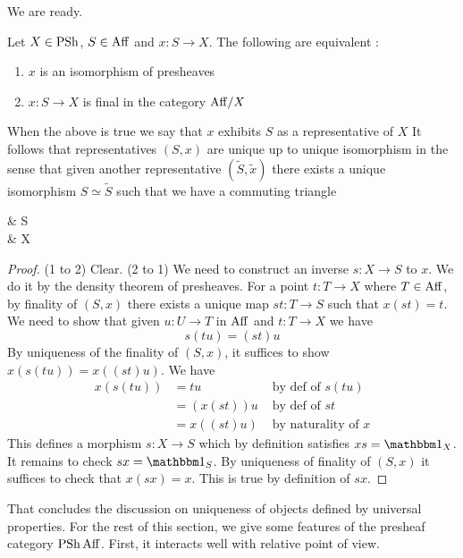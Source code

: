 \documentclass[./main.tex]{subfiles}
\begin{document}
We are ready.
\begin{prop}
  
  Let $X \in \operatorname{PSh}$, $S \in \mathrm{Aff}$ and $x : S \to X$.
  The following are equivalent : 
  \begin{enumerate}
    \item $x$ is an isomorphism of presheaves
    \item $x : S \to X$ is final in the category $\mathrm{Aff} / X$
  \end{enumerate}
  When the above is true we say that
  $x$ exhibits $S$ as a representative of $X$
  It follows that representatives $(S,x)$ are unique up to unique isomorphism
  in the sense that given another representative $(\tilde{S} , \tilde{x})$
  there exists a unique isomorphism $S \simeq \tilde{S}$ such that
  we have a commuting triangle \begin{cd}
    & S \\
    {} & X
    \arrow["{\tilde{x}}"', from=2-1, to=2-2]
    \arrow["x", from=1-2, to=2-2]
    \arrow["\sim", from=2-1, to=1-2]
  \end{cd}
\end{prop}
\begin{proof}
  (1 to 2) Clear.
  (2 to 1) We need to construct an inverse $s : X \to S$ to $x$.
  We do it by the density theorem of presheaves.
  For a point $t : T \to X$ where $T \in \mathrm{Aff}$,
  by finality of $(S , x)$
  there exists a unique map $s t : T \to S$ such that $x (s t) = t$.
  We need to show that given 
  $u : U \to T$ in $\mathrm{Aff}$ and $t : T \to X$ we have \[
    s (t u) = (s t) u
  \]
  By uniqueness of the finality of $(S , x)$,
  it suffices to show $x (s (t u)) = x((s t) u)$.
  We have \begin{align*}
    x(s (t u)) 
    &= t u &\text{    by def of $s (t u)$} \\
    &= (x (s t)) u &\text{    by def of $s t$} \\
    &= x((s t) u) &\text{    by naturality of $x$}
  \end{align*}
  This defines a morphism $s : X \to S$
  which by definition satisfies $x s = \id_X$.
  It remains to check $s x = \id_S$.
  By uniqueness of finality of $(S,x)$ it suffices to check that
  $x (s x) = x$.
  This is true by definition of $s x$.

\end{proof}
That concludes the discussion on uniqueness of objects defined by
universal properties.
For the rest of this section,
we give some features of the presheaf category $\operatorname{PSh} \mathrm{Aff}$.
First, it interacts well with relative point of view.
\end{document}
